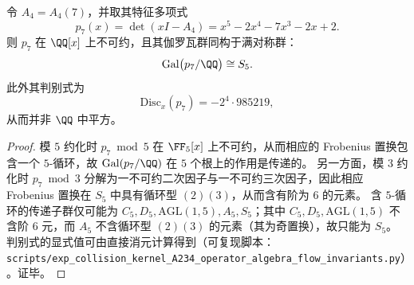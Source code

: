 \begin{proposition}[四阶碰撞核的分裂域与满对称伽罗瓦群]\label{prop:pom-a4-galois-s5}
令 \(A_4=A_4(7)\)，并取其特征多项式
\[
p_7(x)=\det(xI-A_4)=x^5-2x^4-7x^3-2x+2.
\]
则 \(p_7\) 在 \(\QQ[x]\) 上不可约，且其伽罗瓦群同构于满对称群：
\[
\mathrm{Gal}\bigl(p_7/\QQ\bigr)\cong S_5.
\]
此外其判别式为
\[
\mathrm{Disc}_x(p_7)=-2^4\cdot 985219,
\]
从而并非 \(\QQ\) 中平方。
\end{proposition}
\begin{proof}
模 \(5\) 约化时 \(p_7\bmod 5\) 在 \(\FF_5[x]\) 上不可约，从而相应的 Frobenius 置换包含一个 \(5\)-循环，故 \(\mathrm{Gal}(p_7/\QQ)\) 在 \(5\) 个根上的作用是传递的。
另一方面，模 \(3\) 约化时 \(p_7\bmod 3\) 分解为一不可约二次因子与一不可约三次因子，因此相应 Frobenius 置换在 \(S_5\) 中具有循环型 \((2)(3)\)，从而含有阶为 \(6\) 的元素。
含 \(5\)-循环的传递子群仅可能为 \(C_5,D_5,\mathrm{AGL}(1,5),A_5,S_5\)；其中 \(C_5,D_5,\mathrm{AGL}(1,5)\) 不含阶 \(6\) 元，而 \(A_5\) 不含循环型 \((2)(3)\) 的元素（其为奇置换），故只能为 \(S_5\)。
判别式的显式值可由直接消元计算得到（可复现脚本：\texttt{scripts/exp\_collision\_kernel\_A234\_operator\_algebra\_flow\_invariants.py}）。证毕。
\end{proof}






